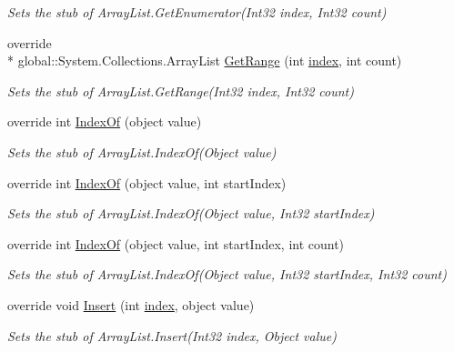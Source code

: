 \begin{DoxyCompactItemize}
\begin{DoxyCompactList}\small\item\em Sets the stub of Array\-List.\-Get\-Enumerator(\-Int32 index, Int32 count)\end{DoxyCompactList}\item 
override \\*
global\-::\-System.\-Collections.\-Array\-List \hyperlink{class_system_1_1_collections_1_1_fakes_1_1_stub_array_list_ad655f410cf1f834aa9ee3274f8b93f08}{Get\-Range} (int \hyperlink{jquery-1_810_82-vsdoc_8js_a75bb12d1f23302a9eea93a6d89d0193e}{index}, int count)
\begin{DoxyCompactList}\small\item\em Sets the stub of Array\-List.\-Get\-Range(\-Int32 index, Int32 count)\end{DoxyCompactList}\item 
override int \hyperlink{class_system_1_1_collections_1_1_fakes_1_1_stub_array_list_a9165b74728cbb070426893099fc08957}{Index\-Of} (object value)
\begin{DoxyCompactList}\small\item\em Sets the stub of Array\-List.\-Index\-Of(\-Object value)\end{DoxyCompactList}\item 
override int \hyperlink{class_system_1_1_collections_1_1_fakes_1_1_stub_array_list_a23065cc099eda60022be5a87bb9620f5}{Index\-Of} (object value, int start\-Index)
\begin{DoxyCompactList}\small\item\em Sets the stub of Array\-List.\-Index\-Of(\-Object value, Int32 start\-Index)\end{DoxyCompactList}\item 
override int \hyperlink{class_system_1_1_collections_1_1_fakes_1_1_stub_array_list_aa50da40b1f4e77d0f9678cadda975a89}{Index\-Of} (object value, int start\-Index, int count)
\begin{DoxyCompactList}\small\item\em Sets the stub of Array\-List.\-Index\-Of(\-Object value, Int32 start\-Index, Int32 count)\end{DoxyCompactList}\item 
override void \hyperlink{class_system_1_1_collections_1_1_fakes_1_1_stub_array_list_ac4ee8939194fc59ffc5926e7cbdfbd05}{Insert} (int \hyperlink{jquery-1_810_82-vsdoc_8js_a75bb12d1f23302a9eea93a6d89d0193e}{index}, object value)
\begin{DoxyCompactList}\small\item\em Sets the stub of Array\-List.\-Insert(\-Int32 index, Object value)\end{DoxyCompactList}\item 

\end{DoxyCompactItemize}
